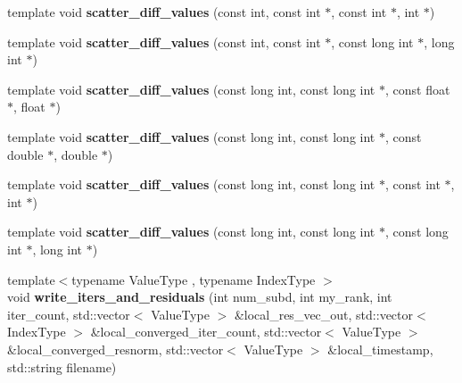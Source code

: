 \begin{DoxyCompactItemize}
\item 
\mbox{\label{namespaceschwz_ada8676d66f231b3a53e5e1ff7d999e50}} 
template void {\bfseries scatter\+\_\+diff\+\_\+values} (const int, const int $\ast$, const int $\ast$, int $\ast$)
\item 
\mbox{\label{namespaceschwz_a454b51812416f906f354513e14b8575c}} 
template void {\bfseries scatter\+\_\+diff\+\_\+values} (const int, const int $\ast$, const long int $\ast$, long int $\ast$)
\item 
\mbox{\label{namespaceschwz_a5d8ea9635fd2508d326deeccd62eca20}} 
template void {\bfseries scatter\+\_\+diff\+\_\+values} (const long int, const long int $\ast$, const float $\ast$, float $\ast$)
\item 
\mbox{\label{namespaceschwz_a5204d95c2a2ac0411bc32e532d17ad8f}} 
template void {\bfseries scatter\+\_\+diff\+\_\+values} (const long int, const long int $\ast$, const double $\ast$, double $\ast$)
\item 
\mbox{\label{namespaceschwz_a9706758b09de68439483045a467392e8}} 
template void {\bfseries scatter\+\_\+diff\+\_\+values} (const long int, const long int $\ast$, const int $\ast$, int $\ast$)
\item 
\mbox{\label{namespaceschwz_a7ac82936a1eec570aac68dc6042f4823}} 
template void {\bfseries scatter\+\_\+diff\+\_\+values} (const long int, const long int $\ast$, const long int $\ast$, long int $\ast$)
\item 
\mbox{\label{namespaceschwz_af5437b273e3d364a2b3fa80929aeded9}} 
{\footnotesize template$<$typename Value\+Type , typename Index\+Type $>$ }\\void {\bfseries write\+\_\+iters\+\_\+and\+\_\+residuals} (int num\+\_\+subd, int my\+\_\+rank, int iter\+\_\+count, std\+::vector$<$ Value\+Type $>$ \&local\+\_\+res\+\_\+vec\+\_\+out, std\+::vector$<$ Index\+Type $>$ \&local\+\_\+converged\+\_\+iter\+\_\+count, std\+::vector$<$ Value\+Type $>$ \&local\+\_\+converged\+\_\+resnorm, std\+::vector$<$ Value\+Type $>$ \&local\+\_\+timestamp, std\+::string filename)
\item 
\mbox{\label{namespaceschwz_a6e174da7b0a888de0b361c6ef27ae10a}} 

\end{DoxyCompactItemize}
